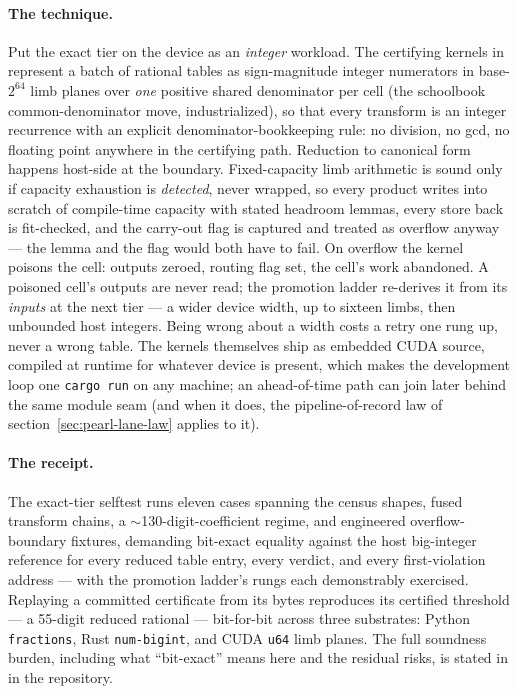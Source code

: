 \paragraph{The technique.} Put the exact tier on the device as an
\emph{integer} workload. The certifying kernels in 
represent a batch of rational tables as sign-magnitude integer
numerators in base-$2^{64}$ limb planes over \emph{one} positive shared
denominator per cell (the schoolbook common-denominator move,
industrialized), so that every transform is an integer recurrence
with an explicit denominator-bookkeeping rule: no division, no gcd, no
floating point anywhere in the certifying path. Reduction to canonical
form happens host-side at the boundary. Fixed-capacity limb arithmetic
is sound only if capacity exhaustion is \emph{detected}, never wrapped,
so every product writes into scratch of compile-time capacity with
stated headroom lemmas, every store back is fit-checked, and the
carry-out flag is captured and treated as overflow anyway --- the lemma
and the flag would both have to fail. On overflow the kernel poisons
the cell: outputs zeroed, routing flag set, the cell's work abandoned.
A poisoned cell's outputs are never read; the promotion ladder
re-derives it from its \emph{inputs} at the next tier --- a wider
device width, up to sixteen limbs, then unbounded host integers. Being
wrong about a width costs a retry one rung up, never a wrong table.
The kernels themselves ship as embedded CUDA source, compiled at
runtime for whatever device is present, which makes the development
loop one \texttt{cargo run} on any machine; an ahead-of-time path can join
later behind the same module seam (and when it does, the
pipeline-of-record law of section~\ref{sec:pearl-lane-law} applies to
it).

\paragraph{The receipt.} The exact-tier selftest runs eleven cases
spanning the census shapes, fused transform chains, a
$\sim$130-digit-coefficient regime, and engineered overflow-boundary
fixtures, demanding bit-exact equality against the host big-integer
reference for every reduced table entry, every verdict, and every
first-violation address --- with the promotion ladder's rungs each
demonstrably exercised. Replaying a committed certificate from its
bytes reproduces its certified threshold --- a 55-digit reduced
rational --- bit-for-bit across three substrates: Python
\texttt{fractions}, Rust \texttt{num-bigint}, and CUDA \texttt{u64}
limb planes. The full soundness burden, including what ``bit-exact''
means here and the residual risks, is stated in
 in the
 repository.

